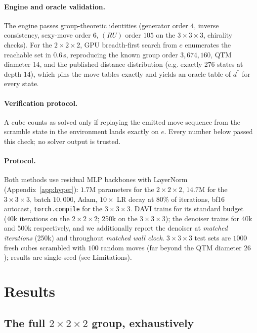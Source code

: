 \documentclass[11pt]{article}
\newcommand{\eg}{e.g.}
\newcommand{\dstar}{d^{*}}
\begin{document}
\paragraph{Engine and oracle validation.}
The engine passes group-theoretic identities (generator order $4$, inverse
consistency, sexy-move order $6$, $(RU)$ order $105$ on the
$3{\times}3{\times}3$, chirality checks). For the $2{\times}2{\times}2$, GPU
breadth-first search from $e$ enumerates the reachable set in $0.6$\,s,
reproducing the known group order $3{,}674{,}160$, QTM diameter $14$, and the
published distance distribution (\eg{} exactly $276$ states at depth $14$),
which pins the move tables exactly and yields an oracle table of
$\dstar$ for every state.

\paragraph{Verification protocol.}
A cube counts as solved only if replaying the emitted move sequence from the
scramble state in the environment lands exactly on $e$. Every number below
passed this check; no solver output is trusted.

\paragraph{Protocol.}
Both methods use residual MLP backbones with LayerNorm
(Appendix~\ref{app:hyper}): $1.7$M parameters for the $2{\times}2{\times}2$,
$14.7$M for the $3{\times}3{\times}3$, batch $10{,}000$, Adam,
$10\times$ LR decay at $80\%$ of iterations, bf16 autocast,
\texttt{torch.compile} for the $3{\times}3{\times}3$. DAVI trains for its
standard budget (40k iterations on the $2{\times}2{\times}2$; 250k on the
$3{\times}3{\times}3$); the denoiser trains for 40k and 500k respectively, and
we additionally report the denoiser at \emph{matched iterations} (250k) and
throughout \emph{matched wall clock}. $3{\times}3{\times}3$ test sets are
$1000$ fresh cubes scrambled with $100$ random moves (far beyond the QTM
diameter $26$); results are single-seed (see Limitations).

\section{Results}
\label{sec:results}

\subsection{The full $2{\times}2{\times}2$ group, exhaustively}
\end{document}
